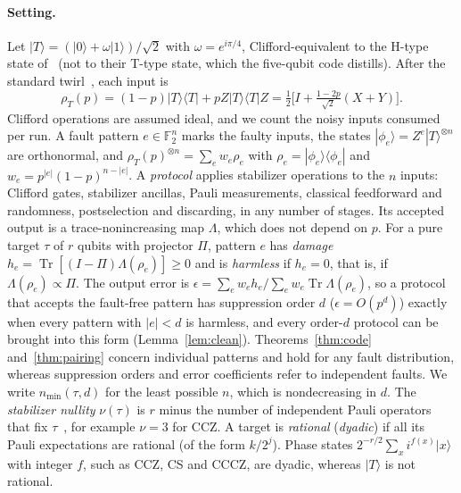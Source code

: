 \documentclass[aps,prl,reprint,twocolumn,amsmath,amssymb,floatfix,nofootinbib,superscriptaddress]{revtex4-2}
\newcommand{\F}{\mathbb F_2}
\newcommand{\tr}{\operatorname{Tr}}
\begin{document}
\paragraph*{Setting.}
Let $|T\rangle=(|0\rangle+\omega|1\rangle)/\sqrt2$ with $\omega=e^{i\pi/4}$, Clifford-equivalent to the H-type state of~\cite{bravyikitaev} (not to their T-type state, which the five-qubit code distills). After the standard twirl~\cite{bravyikitaev}, each input is
\begin{equation}
 \rho_T(p)=(1-p)|T\rangle\langle T|+pZ|T\rangle\langle T|Z=\tfrac12\bigl[I+\tfrac{1-2p}{\sqrt2}(X+Y)\bigr].
 \label{eq:input}
\end{equation}
Clifford operations are assumed ideal, and we count the noisy inputs consumed per run. A fault pattern $e\in\F^n$ marks the faulty inputs, the states $|\phi_e\rangle=Z^e|T\rangle^{\otimes n}$ are orthonormal, and $\rho_T(p)^{\otimes n}=\sum_ew_e\rho_e$ with $\rho_e=|\phi_e\rangle\langle\phi_e|$ and $w_e=p^{|e|}(1-p)^{n-|e|}$. A \emph{protocol} applies stabilizer operations to the $n$ inputs: Clifford gates, stabilizer ancillas, Pauli measurements, classical feedforward and randomness, postselection and discarding, in any number of stages. Its accepted output is a trace-nonincreasing map $\Lambda$, which does not depend on $p$. For a pure target $\tau$ of $r$ qubits with projector $\Pi$, pattern $e$ has \emph{damage} $h_e=\tr[(I-\Pi)\Lambda(\rho_e)]\geq0$ and is \emph{harmless} if $h_e=0$, that is, if $\Lambda(\rho_e)\propto\Pi$. The output error is $\epsilon=\sum_ew_eh_e/\sum_ew_e\tr\Lambda(\rho_e)$, so a protocol that accepts the fault-free pattern has suppression order $d$ ($\epsilon=O(p^d)$) exactly when every pattern with $|e|<d$ is harmless, and every order-$d$ protocol can be brought into this form (Lemma~\ref{lem:clean}). Theorems~\ref{thm:code} and~\ref{thm:pairing} concern individual patterns and hold for any fault distribution, whereas suppression orders and error coefficients refer to independent faults. We write $n_{\min}(\tau,d)$ for the least possible $n$, which is nondecreasing in $d$. The \emph{stabilizer nullity} $\nu(\tau)$ is $r$ minus the number of independent Pauli operators that fix $\tau$~\cite{beverland}, for example $\nu=3$ for CCZ. A target is \emph{rational} (\emph{dyadic}) if all its Pauli expectations are rational (of the form $k/2^j$). Phase states $2^{-r/2}\sum_xi^{f(x)}|x\rangle$ with integer $f$, such as CCZ, CS and CCCZ, are dyadic, whereas $|T\rangle$ is not rational.
\end{document}
